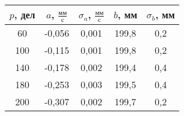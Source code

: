 \begin{tabular}[t]{|c|c|c|c|c|}
\hline
$p$, дел & $a$, $\frac{мм}{с}$ & $\sigma_a$, $\frac{мм}{с}$ & $b$, мм & $\sigma_b$, мм \\ 
\hline
60 & -0,056 & 0,001 & 199,8 & 0,2 \\ 
100 & -0,115 & 0,001 & 199,8 & 0,2 \\ 
140 & -0,178 & 0,002 & 199,4 & 0,4 \\ 
180 & -0,253 & 0,003 & 199,5 & 0,4 \\ 
200 & -0,307 & 0,002 & 199,7 & 0,2 \\ 
\hline
\end{tabular}